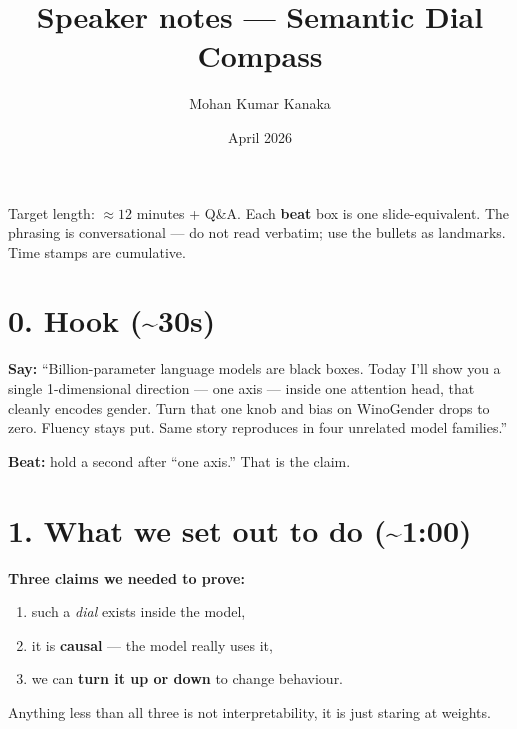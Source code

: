 \documentclass[11pt]{article}
\title{\textbf{Speaker notes --- Semantic Dial Compass}}
\author{Mohan Kumar Kanaka}
\date{April 2026}
\begin{document}
\maketitle
\vspace{-24pt}

\noindent\small
Target length: $\approx 12$ minutes + Q\&A. Each \textbf{beat} box is one
slide-equivalent. The phrasing is conversational --- do not read verbatim;
use the bullets as landmarks. Time stamps are cumulative.

\section*{0. Hook (\textasciitilde 30s)}
\begin{tcolorbox}[beat]
\textbf{Say:} ``Billion-parameter language models are black boxes. Today I'll
show you a single 1-dimensional direction --- one axis --- inside one
attention head, that cleanly encodes gender. Turn that one knob and bias on
WinoGender drops to zero. Fluency stays put. Same story reproduces in four
unrelated model families.''

\textbf{Beat:} hold a second after ``one axis.'' That is the claim.
\end{tcolorbox}

\section*{1. What we set out to do (\textasciitilde 1:00)}
\begin{tcolorbox}[beat]
\textbf{Three claims we needed to prove:}
\begin{enumerate}
  \item such a \emph{dial} exists inside the model,
  \item it is \textbf{causal} --- the model really uses it,
  \item we can \textbf{turn it up or down} to change behaviour.
\end{enumerate}
Anything less than all three is not interpretability, it is just staring at
weights.
\end{tcolorbox}

\end{document}

